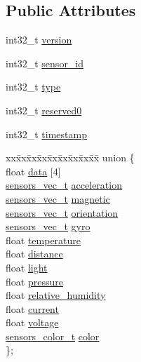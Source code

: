 \subsection*{Public Attributes}
\begin{DoxyCompactItemize}
\item 
int32\+\_\+t \hyperlink{structsensors__event__t_a2134d60fdb21e3495c595a2df2f5cece}{version}
\item 
int32\+\_\+t \hyperlink{structsensors__event__t_a6b06d35b17afbee79de7f45d9d71ed0b}{sensor\+\_\+id}
\item 
int32\+\_\+t \hyperlink{structsensors__event__t_a58401dd7f3400d9eb96c71b8fba9f8e8}{type}
\item 
int32\+\_\+t \hyperlink{structsensors__event__t_a8be4dc00344f46abf29e06251bf9fad9}{reserved0}
\item 
int32\+\_\+t \hyperlink{structsensors__event__t_acd3be1560458b3e3bf52f93f744e8238}{timestamp}
\item 
\begin{tabbing}
xx\=xx\=xx\=xx\=xx\=xx\=xx\=xx\=xx\=\kill
union \{\\
\>float \hyperlink{structsensors__event__t_addee33a715123e16eb463e5cc9024fe2}{data} \mbox{[}4\mbox{]}\\
\>\hyperlink{structsensors__vec__t}{sensors\_vec\_t} \hyperlink{structsensors__event__t_a91a4325f468d3155e6921358a6f61baa}{acceleration}\\
\>\hyperlink{structsensors__vec__t}{sensors\_vec\_t} \hyperlink{structsensors__event__t_aa634d41a024e1cacdceecf85ec326698}{magnetic}\\
\>\hyperlink{structsensors__vec__t}{sensors\_vec\_t} \hyperlink{structsensors__event__t_acbe3c50a256fa9423bc9e3a6e0da7ebf}{orientation}\\
\>\hyperlink{structsensors__vec__t}{sensors\_vec\_t} \hyperlink{structsensors__event__t_ad108ea8c3a18d02cfc674ba27e94a2c4}{gyro}\\
\>float \hyperlink{structsensors__event__t_a914f76beb75bd99aa3c13d3a8e56e21c}{temperature}\\
\>float \hyperlink{structsensors__event__t_a456259aaeb265913281d7ffbd8ad8697}{distance}\\
\>float \hyperlink{structsensors__event__t_adefd2ce2da44e4449ef7cadeaecc6cfd}{light}\\
\>float \hyperlink{structsensors__event__t_a2ec6e34e1a6cf832d85ca19066bd38f0}{pressure}\\
\>float \hyperlink{structsensors__event__t_a577b73698368fb061382ce9f31052417}{relative\_humidity}\\
\>float \hyperlink{structsensors__event__t_ad34303af57d6bce18c34862a887fc005}{current}\\
\>float \hyperlink{structsensors__event__t_ab01b52f6b83f390a6370d319ded97b28}{voltage}\\
\>\hyperlink{structsensors__color__t}{sensors\_color\_t} \hyperlink{structsensors__event__t_a56b4d05fbf47013727ec1a0a94db91e6}{color}\\
\}; \\

\end{tabbing}\end{DoxyCompactItemize}



